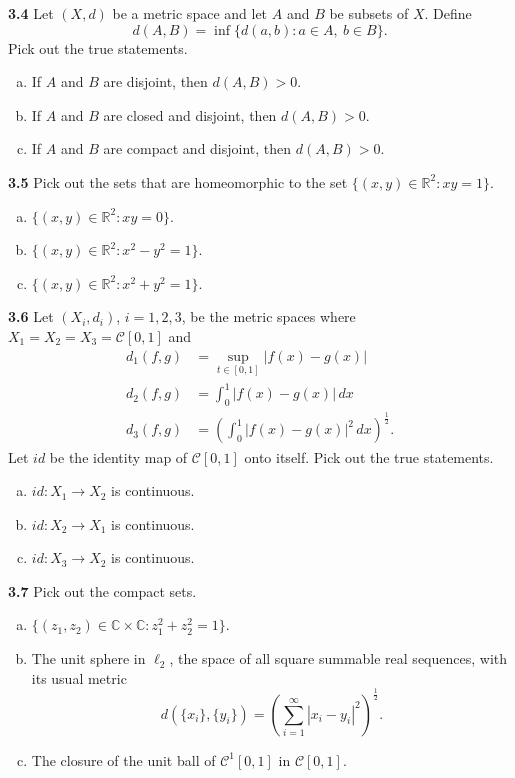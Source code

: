 \documentclass[11pt,a4paper]{article}
\newcommand{\R}{\mathbb{R}}
\newcommand{\C}{\mathbb{C}}
\newcommand{\qitem}[1]{\par\medskip\noindent\textbf{#1}\hspace{0.5em}}
\begin{document}
\qitem{3.4} Let $(X, d)$ be a metric space and let $A$ and $B$ be subsets of $X$. Define
\[
  d(A, B) = \inf\{d(a, b) : a \in A,\ b \in B\}.
\]
Pick out the true statements.
\begin{enumerate}[a.]
  \item If $A$ and $B$ are disjoint, then $d(A, B) > 0$.
  \item If $A$ and $B$ are closed and disjoint, then $d(A, B) > 0$.
  \item If $A$ and $B$ are compact and disjoint, then $d(A, B) > 0$.
\end{enumerate}

\qitem{3.5} Pick out the sets that are homeomorphic to the set $\{(x, y) \in \R^2 : xy = 1\}$.
\begin{enumerate}[a.]
  \item $\{(x, y) \in \R^2 : xy = 0\}$.
  \item $\{(x, y) \in \R^2 : x^2 - y^2 = 1\}$.
  \item $\{(x, y) \in \R^2 : x^2 + y^2 = 1\}$.
\end{enumerate}

\qitem{3.6} Let $(X_i, d_i)$, $i = 1, 2, 3$, be the metric spaces where $X_1 = X_2 = X_3 = \mathcal{C}[0, 1]$ and
\begin{align*}
  d_1(f, g) &= \sup_{t \in [0, 1]} |f(x) - g(x)| \\
  d_2(f, g) &= \int_0^1 |f(x) - g(x)|\,dx \\
  d_3(f, g) &= \left(\int_0^1 |f(x) - g(x)|^2\,dx\right)^{\frac{1}{2}}.
\end{align*}
Let $id$ be the identity map of $\mathcal{C}[0, 1]$ onto itself. Pick out the true statements.
\begin{enumerate}[a.]
  \item $id : X_1 \to X_2$ is continuous.
  \item $id : X_2 \to X_1$ is continuous.
  \item $id : X_3 \to X_2$ is continuous.
\end{enumerate}

\qitem{3.7} Pick out the compact sets.
\begin{enumerate}[a.]
  \item $\{(z_1, z_2) \in \C \times \C : z_1^2 + z_2^2 = 1\}$.
  \item The unit sphere in $\ell_2$, the space of all square summable real sequences, with its usual metric
  \[
    d(\{x_i\}, \{y_i\}) = \left(\sum_{i=1}^{\infty} |x_i - y_i|^2\right)^{\frac{1}{2}}.
  \]
  \item The closure of the unit ball of $\mathcal{C}^1[0, 1]$ in $\mathcal{C}[0, 1]$.
\end{enumerate}
\end{document}
